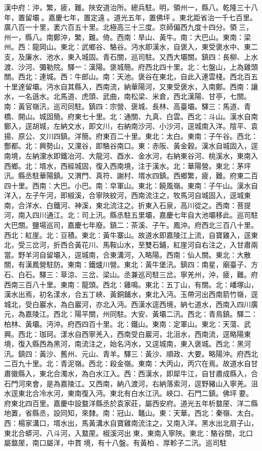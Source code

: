 \begin{pinyinscope}
漢中府：沖，繁，疲，難。陜安道治所。總兵駐。明，領州一，縣八。乾隆三十八年，置留壩。嘉慶七年，置定遠。道光五年，置佛坪。東北距省治一千七百里。廣八百一十里，袤六百五十里。北極高三十三度。京師偏西九度十四分。領三，州一，縣八。南鄭沖，繁，難。倚。西南：旱山、黃牛。南：大巴山。東南：梁州。西：龍岡山。東北：武鄉谷、駱谷。沔水即漢水，自褒入，東受褒水中、東二支，及廉水、池水，東入城固。青石關，巡司駐。又西大壩關。鎮四：長柳、上水渡、沙河、彌勒院。驛一：漢陽。褒城簡。府西北四十里。北：七盤山，上為雞頭關。西北：連城。西：牛郎山。南：天池。褒谷在東北，自此入連雲棧。西北百五十里達留壩。沔水自其縣入，西南流，納華陽河，又東受褒水，入南鄭。西南：讓水，一名遜水。北馬道、虎頭、武曲，南松梁、米倉，西北漢陽、甘亭，七關。南：黃官嶺汛，巡司同駐。鎮四：宗營、褒城、長林、高臺壩。驛三：馬道、青橋、開山。城固簡。府東七十里。北：通關、九真、白雲。西北：斗山。漢水自南鄭入，逕胡城，左納文水，即文川，右納南沙河、小沙河，逕城南入洋。陰平、袁揚、原公、文川四鎮。洋簡。府東百二十里。東北：太白。東南：子午谷。西北：酆都。北：興勢山，又灙谷，即駱谷南口。東：赤阪、黃金穀。漢水自城固入，逕南境，左納灙水即鐵冶河、大龍河、酉水、金水河，右納東谷河、桃溪水，東南入西鄉。北：壻水，西經城固，復入西南境，注于漢水。北：華陽營。東北：茅坪汛。縣丞駐華陽鎮。又渭門、真符、謝村、壻水四鎮。西鄉繁，疲，難。府東二百四十里。西南：大巴。小巴。南：皁軍山。東北：饒風嶺。東南：子午山。漢水自洋入，左子午河，即椒溪，合寧陜紋河，西南流注之，牧馬河自城固入，逕城東南，合洋水、白鐵河、神溪，東北流注之。折東入石泉，高川從之。西南：菩提河，南入四川通江。北：司上汛。縣丞駐五里壩，嘉慶七年自大池壩移此。巡司駐大巴關。鹽場巡司，嘉慶七年廢。鎮二：茶溪、子午。鳳沖。府西北三百八十里。西北：紅崖。北：豆積。東北：黃牛寨山。故道水即嘉陵江上流，自寶雞入，逕東北，受三岔河，折西合黃花川、馬鞍山水，至雙石鋪，紅崖河自右注之，入甘肅兩當。野羊河自留壩入，逕城南，合東溝河，入略陽。西南：仙人關。東北：大散關，有漢鳳營駐防。東南：鐵爐川營。東北：黃牛堡汛。鎮四：南星，廟臺子、方石、白石。驛三：草涼、三岔、梁山。丞兼巡司駐三岔。寧羌州，沖，疲，難。府西南三百八十里。東南：龍頭。西北：雞鳴。東北：五丁山，有關。北：嶓塚山，漢水出焉，初名漾水，合五丁峽、黃銅鋪水，東北入沔。玉帶河出西南箭竹嶺，逕城北，受白巖水，為白巖河，亦北入沔。西漢水逕西境，納七道水，西南入四川廣元，為嘉陵江。西北：陽平關，州同駐。大安、黃壩二汛。西北：青鳥鎮。驛二：柏林、黃壩。沔沖。府西四百十里。北：鐵山。東南：定軍山。東北：天蕩、武興。西北：珈珂。漾水自西寧羌入，西南受白巖河，北沮水，西南流，逕略陽東境，復入縣西為黑河，南流注之，始名沔水，又逕城南，東入褒城。西北：黑河汛。鎮四：黃沙、舊州、元山、青羊。驛三：黃沙、順政、大要。略陽沖。府西北二百九十里。北：青泥嶺。西北：殺金嶺。東南：大丙山，丙穴在焉。故道水自甘肅徽縣入，東北合濁水，為白水江入。西：西漢水，即犀牛江，自甘肅成縣入，合石門河來會，是為嘉陵江。又西南，納八渡河，右納落索河，逕野豬山入寧羌。沮水逕東北合冷水河，東南復入沔。東北有白水江汛。峽口、石門二鎮。佛坪要。府東北四百里。嘉慶中設盩洋縣丞於袁家莊，屬西安府。道光五年析盩厔、洋二縣地置，省縣丞，設同知，來隸。南：冠山、鼇山。東：天華。西北：秦嶺、太白。西：楊家溝口，壻水出，馬黃溝水自寶雞南流注之，又南入洋。黑水出北扇子山，東北合蟒河、八斗河，入盩厔。椒溪河出東，東南入寧陜。東北：駱谷關，北口屬盩厔，南口屬洋，中貫境，有十八盤。有黃柏、厚軫子二汛。巡司駐
\end{pinyinscope}
